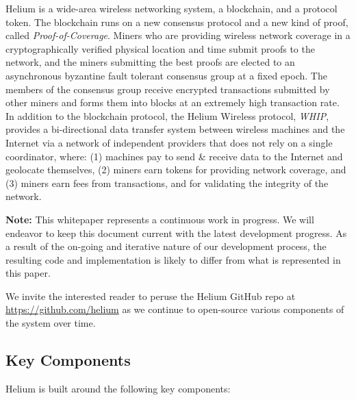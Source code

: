 \documentclass[10pt, nonatbib, nocopyrightspace, reprint]{sigplanconf}
\begin{document}
Helium is a wide-area wireless networking system, a blockchain, and a protocol token. The blockchain runs on a new consensus protocol and a new kind of proof, called \emph{Proof-of-Coverage}. Miners who are providing wireless network coverage in a cryptographically verified physical location and time submit proofs to the network, and the miners submitting the best proofs are elected to an asynchronous byzantine fault tolerant consensus group at a fixed epoch. The members of the consensus group receive encrypted transactions submitted by other miners and forms them into blocks at an extremely high transaction rate. In addition to the blockchain protocol, the Helium Wireless protocol, \emph{WHIP}, provides a bi-directional data transfer system between wireless machines and the Internet via a network of independent providers that does not rely on a single coordinator, where: (1) machines pay to send \& receive data to the Internet and geolocate themselves, (2) miners earn tokens for providing network coverage, and (3) miners earn fees from transactions, and for validating the integrity of the network.

\textbf{Note:} This whitepaper represents a continuous work in progress. We will endeavor to keep this document current with the latest development progress. As a result of the on-going and iterative nature of our development process, the resulting code and implementation is likely to differ from what is represented in this paper.

We invite the interested reader to peruse the Helium GitHub repo at \url{https://github.com/helium} as we continue to open-source various components of the system over time.

\subsection{Key Components}

Helium is built around the following key components:
\end{document}
